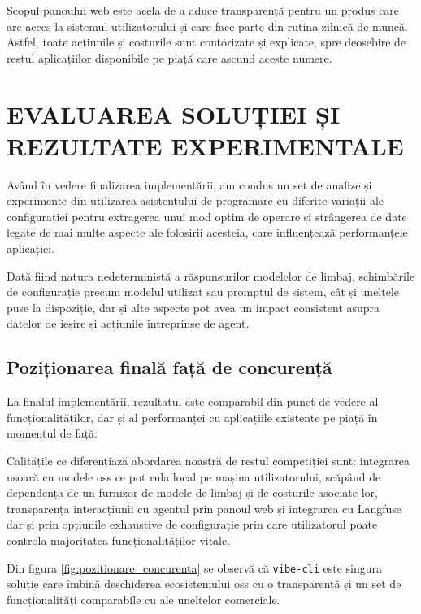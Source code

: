 \documentclass[12pt, a4paper, oneside, romanian]{teza-upb}
\begin{document}
    Scopul panoului web este acela de a aduce transparență pentru un produs care are acces la sistemul utilizatorului și care face parte din rutina zilnică de muncă. Astfel, toate acțiunile și costurile sunt contorizate
    și explicate, spre deosebire de restul aplicațiilor disponibile pe piață care ascund aceste numere.

\chapter{EVALUAREA SOLUȚIEI ȘI REZULTATE EXPERIMENTALE}

    Având în vedere finalizarea implementării, am condus un set de analize și experimente din utilizarea asistentului de programare
    cu diferite variații ale configurației pentru extragerea unui mod optim de operare și strângerea de date legate de mai multe
    aspecte ale folosirii acesteia, care influențează performanțele aplicației.

    Dată fiind natura nedeterministă a răspunsurilor modelelor de limbaj, schimbările de configurație precum modelul utilizat sau promptul de sistem,
    cât și uneltele puse la dispoziție, dar și alte aspecte pot avea un impact consistent asupra datelor de ieșire și acțiunile întreprinse de agent.

  \section{Poziționarea finală față de concurență}

    La finalul implementării, rezultatul este comparabil din punct de vedere al
    funcționalităților, dar și al performanței cu aplicațiile existente pe piață în momentul de față.

    Calitățile ce diferențiază abordarea noastră de restul competiției sunt: integrarea ușoară cu modele \ac{oss} ce pot rula local pe mașina utilizatorului,
    scăpând de dependența de un furnizor de modele de limbaj și de costurile asociate lor, transparența interacțiunii cu agentul prin
    panoul web și integrarea cu Langfuse dar și prin opțiunile exhaustive de configurație prin care utilizatorul poate controla majoritatea funcționalităților vitale.

    Din figura \ref{fig:pozitionare_concurenta} se observă că \texttt{vibe-cli} este
    singura soluție care îmbină deschiderea ecosistemului \ac{oss} cu o transparență și un set de
    funcționalități comparabile cu ale uneltelor comerciale.
\end{document}
